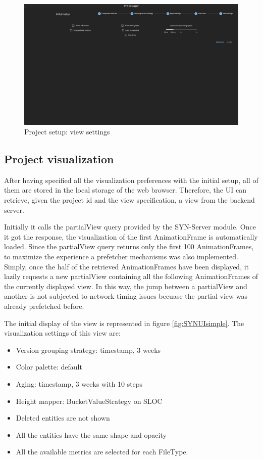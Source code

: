 \begin{figure}
    \center
    \includegraphics[width=\textwidth]{SYNUI-settings5.png}
    \caption{Project setup: view settings}
    \label{fig:SYNUIsettings5}
\end{figure}

\subsection*{Project visualization}
After having specified all the visualization preferences with the initial setup, all of them are stored in the local storage of the web browser. 
Therefore, the UI can retrieve, given the project id and the view specification, a view from the backend server. 

Initially it calls the partialView query provided by the SYN-Server module. Once it got the response, the visualization of the first AnimationFrame is automatically loaded. 
Since the partialView query returns only the first 100 AnimationFrames, to maximize the experience a prefetcher mechanisms was also implemented. 
Simply, once the half of the retrieved AnimationFrames have been displayed, it lazily requests a new partialView containing all the following AnimationFrames of the currently displayed view. 
In this way, the jump between a partialView and another is not subjected to network timing issues becuase the partial view was already prefetched before. 
\bigbreak

The initial display of the view is represented in figure \ref{fig:SYNUIsimple}. The visualization settings of this view are:
\begin{itemize}
    \item Version grouping strategy: timestamp, 3 weeks
    \item Color palette: default
    \item Aging: timestamp, 3 weeks with 10 steps
    \item Height mapper: BucketValueStrategy on SLOC
    \item Deleted entities are not shown
    \item All the entities have the same shape and opacity
    \item All the available metrics are selected for each FileType. 
\end{itemize}

